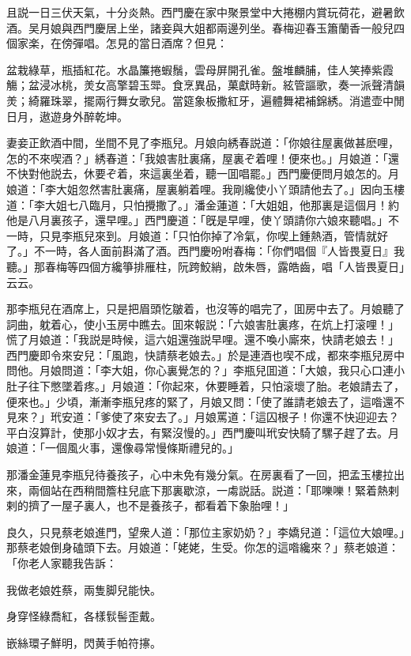 且説一日三伏天氣，十分炎熱。西門慶在家中聚景堂中大捲棚内賞玩荷花，避暑飲酒。吴月娘與西門慶居上坐，諸妾與大姐都兩邊列坐。春梅迎春玉簫蘭香一般兒四個家楽，在傍彈唱。怎見的當日酒席？但見：

盆栽綠草，瓶插紅花。水晶簾捲蝦鬚，雲母屏開孔雀。盤堆麟脯，佳人笑捧紫霞觴；盆浸冰桃，羙女高擎碧玉斝。食烹異品，菓獻時新。絃管謳歌，奏一派聲清韻羙；綺羅珠翠，擺兩行舞女歌兒。當筵象板撒紅牙，遍體舞裙補錦綉。消遣壶中閒日月，遨遊身外醉乾坤。

妻妾正飲酒中間，坐間不見了李瓶兒。月娘向綉春説道：「你娘往屋裏做甚麽哩，怎的不來喫酒？」綉春道：「我娘害肚裏痛，屋裏ぞ着哩！便來也。」月娘道：「還不快對他説去，休要ぞ着，來這裏坐着，聽一囬唱罷。」西門慶便問月娘怎的。月娘道：「李大姐忽然害肚裏痛，屋裏躺着哩。我剛纔使小丫頭請他去了。」因向玉樓道：「李大姐七八臨月，只怕攪撒了。」潘金蓮道：「大姐姐，他那裏是這個月！約他是八月裏孩子，還早哩。」西門慶道：「旣是早哩，使丫頭請你六娘來聽唱。」不一時，只見李瓶兒來到。月娘道：「只怕你掉了冷氣，你喫上鍾熱酒，管情就好了。」不一時，各人面前斟滿了酒。西門慶吩咐春梅：「你們唱個『人皆畏夏日』我聽。」那春梅等四個方纔箏排雁柱，阮跨鮫綃，啟朱唇，露皓齒，唱「人皆畏夏日」云云。

那李瓶兒在酒席上，只是把眉頭忔皺着，也沒等的唱完了，囬房中去了。月娘聽了詞曲，躭着心，使小玉房中瞧去。囬來報説：「六娘害肚裏疼，在炕上打滚哩！」慌了月娘道：「我説是時候，這六姐還強説早哩。還不喚小廝來，快請老娘去！」西門慶即令來安兒：「風跑，快請蔡老娘去。」於是連酒也喫不成，都來李瓶兒房中問他。月娘問道：「李大姐，你心裏覺怎的？」李瓶兒囬道：「大娘，我只心口連小肚子往下憋墜着疼。」月娘道：「你起來，休要睡着，只怕滚壞了胎。老娘請去了，便來也。」少頃，漸漸李瓶兒疼的緊了，月娘又問：「使了誰請老娘去了，這喒還不見來？」玳安道：「爹使了來安去了。」月娘罵道：「這囚根子！你還不快迎迎去？平白沒算計，使那小奴才去，有緊沒慢的。」西門慶叫玳安快騎了騾子趕了去。月娘道：「一個風火事，還像尋常慢條斯禮兒的。」

那潘金蓮見李瓶兒待養孩子，心中未免有幾分氣。在房裏看了一回，把孟玉樓拉出來，兩個站在西稍間簷柱兒底下那裏歇涼，一䖏説話。説道：「耶嚛嚛！緊着熱剌剌的擠了一屋子裏人，也不是養孩子，都看着下象胎哩！」

良久，只見蔡老娘進門，望衆人道：「那位主家奶奶？」李嬌兒道：「這位大娘哩。」那蔡老娘倒身磕頭下去。月娘道：「姥姥，生受。你怎的這喒纔來？」蔡老娘道：「你老人家聽我告訴：

我做老娘姓蔡，兩隻脚兒能快。

身穿怪綠喬紅，各樣䯼髻歪戴。

嵌絲環子鮮明，閃黄手帕符㩟。

